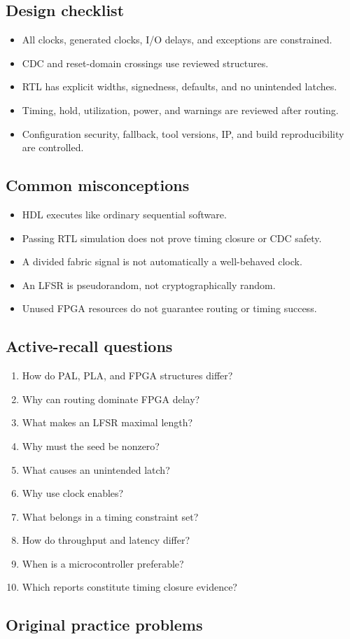 \documentclass[10pt,letterpaper]{article}
\begin{document}
\subsection{Design checklist}
\begin{itemize}
  \item All clocks, generated clocks, I/O delays, and exceptions are constrained.
  \item CDC and reset-domain crossings use reviewed structures.
  \item RTL has explicit widths, signedness, defaults, and no unintended latches.
  \item Timing, hold, utilization, power, and warnings are reviewed after routing.
  \item Configuration security, fallback, tool versions, IP, and build reproducibility are controlled.
\end{itemize}\subsection{Common misconceptions}
\begin{itemize}
  \item HDL executes like ordinary sequential software.
  \item Passing RTL simulation does not prove timing closure or CDC safety.
  \item A divided fabric signal is not automatically a well-behaved clock.
  \item An LFSR is pseudorandom, not cryptographically random.
  \item Unused FPGA resources do not guarantee routing or timing success.
\end{itemize}\subsection{Active-recall questions}
\begin{enumerate}
  \item How do PAL, PLA, and FPGA structures differ?
  \item Why can routing dominate FPGA delay?
  \item What makes an LFSR maximal length?
  \item Why must the seed be nonzero?
  \item What causes an unintended latch?
  \item Why use clock enables?
  \item What belongs in a timing constraint set?
  \item How do throughput and latency differ?
  \item When is a microcontroller preferable?
  \item Which reports constitute timing closure evidence?
\end{enumerate}\subsection{Original practice problems}
\end{document}
